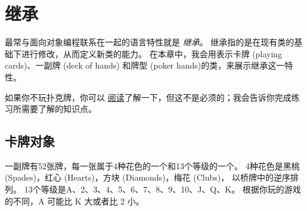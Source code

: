 


\chapter{继承}


最常与面向对象编程联系在一起的语言特性就是 {\em 继承}。  
继承指的是在现有类的基础下进行修改，从而定义新类的能力。  
在本章中，我会用表示卡牌 (playing cards)、一副牌 (deck of hands) 和牌型 (poker hands)的类，来展示继承这一特性。

    


如果你不玩扑克牌，你可以 \href{http://en.wikipedia.org/wiki/Poker}{阅读}了解一下，但这不是必须的；我会告诉你完成练习所需要了解的知识点。


\section{卡牌对象}


一副牌有52张牌，每一张属于4种花色的一个和13个等级的一个。  
4种花色是黑桃 (Spades)，红心 (Hearts)，方块 (Diamonds)，梅花 (Clubs)，
以桥牌中的逆序排列。  13个等级是A、2、3、4、5、6、7、8、9、10、J、Q、K。  
根据你玩的游戏的不同，A 可能比 K 大或者比 2 小。


